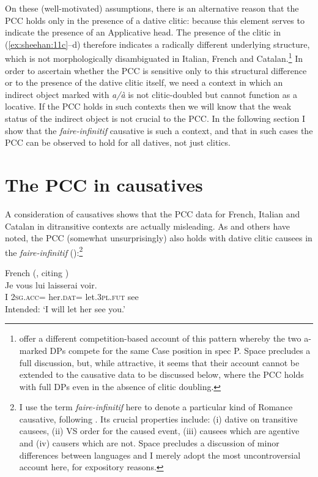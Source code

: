 \documentclass[output=paper,colorlinks,citecolor=brown,nonflat]{langsci/langscibook}
\begin{document}
On these (well-motivated) assumptions, there is an alternative reason that the PCC holds only in the presence of a dative clitic:  because this element serves to indicate the presence of an Applicative head. The presence of the clitic in (\ref{ex:sheehan:11c}--d) therefore indicates a radically different underlying structure, which is not morphologically disambiguated in Italian, French and Catalan.\footnote{\citet{OrmazabalRomero2013Borealis} offer a different competition-based account of this pattern whereby the two a-marked DPs compete for the same Case position in spec {\liv}P. Space precludes a full discussion, but, while attractive, it seems that their account cannot be extended to the causative data to be discussed below, where the PCC holds with full DPs even in the absence of clitic doubling.} In order to ascertain whether the PCC is sensitive only to this structural difference or to the presence of the dative clitic itself, we need a context in which an indirect object marked with \textit{a/à} is not clitic-doubled but cannot function as a locative. If the PCC holds in such contexts then we will know that the weak status of the indirect object is not crucial to the PCC. In the following section I show that the \textit{faire-infinitif} causative is such a context, and that in such cases the PCC can be observed to hold for all datives, not just clitics.

\section{The PCC in causatives}\label{sec:sheehan:3}

A consideration of causatives shows that the PCC data for French, Italian and Catalan in ditransitive contexts are actually misleading. As \citet{Bonet1991} and others have noted, the PCC (somewhat unsurprisingly) also holds with dative clitic causees in the \textit{faire-infinitif} (\citealt{Postal1981,Quicoli1984,Rezac2008}):\footnote{I use the term \emph{faire-infinitif} here to denote a particular kind of Romance causative, following \citet{Kayne1975}. Its crucial properties include: (i) dative on transitive causees, (ii) VS order for the caused event, (iii) causees which are agentive and (iv) causers which are not. Space precludes a discussion of minor differences between languages and I merely adopt the most uncontroversial account here, for expository reasons.}

\ea%
    \label{ex:sheehan:13}
    French (\citealt[66]{Rezac2008}, citing \citealt{Postal1981, Quicoli1984})\\
    \gll    *Je   vous     lui           laisserai   voir.\\
            I      2\textsc{sg}.\textsc{acc}=   her.\textsc{dat=}   let.3\textsc{pl}.\textsc{fut}    see\\
    \glt    Intended: ‘I will let her see you.'
\z
\end{document}
